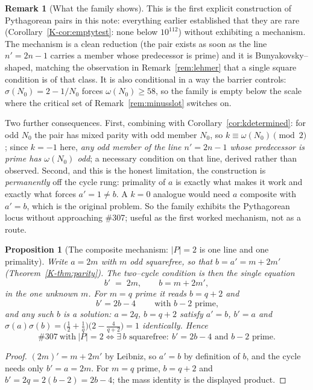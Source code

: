 \documentclass[11pt]{article}
\newtheorem{proposition}[theorem]{Proposition}
\theoremstyle{definition}
\newtheorem{remark}[theorem]{Remark}
\begin{document}
\begin{remark}[What the family shows]\label{rem:familyshows}
This is the first explicit construction of Pythagorean pairs in this note: everything earlier
established that they are rare \textup{(}Corollary~\ref{K-cor:emptytest}: none below $10^{112}$\textup{)}
without exhibiting a mechanism. The mechanism is a clean reduction (the pair exists as soon as the
line $n'=2n-1$ carries a member whose predecessor is prime) and it is Bunyakovsky--shaped, matching
the observation in Remark~\ref{rem:lehmer} that a single square condition is of that class. It is also
conditional in a way the barrier controls: $\sigma(N_0)=2-1/N_0$ forces $\omega(N_0)\ge58$, so the
family is empty below the scale where the critical set of Remark~\ref{rem:minusslot} switches on.

Two further consequences. First, combining with Corollary~\ref{cor:kdetermined}: for odd $N_0$ the
pair has mixed parity with odd member $N_0$, so $k\equiv\omega(N_0)\pmod2$; since $k=-1$ here,
\emph{any odd member of the line $n'=2n-1$ whose predecessor is prime has $\omega(N_0)$ odd}; a
necessary condition on that line, derived rather than observed. Second, and this is the honest
limitation, the construction is \emph{permanently} off the cycle rung: primality of $a$ is exactly
what makes it work and exactly what forces $a'=1\ne b$. A $k=0$ analogue would need $a$ composite with
$a'=b$, which is the original problem. So the family exhibits the Pythagorean locus without
approaching \#307; useful as the first worked mechanism, not as a route.
\end{remark}

\begin{proposition}[The composite mechanism: $|P|=2$ is one line and one primality]\label{prop:compositea}
Write $a=2m$ with $m$ odd squarefree, so that $b=a'=m+2m'$ \textup{(}Theorem~\ref{K-thm:parity}\textup{)}.
The two--cycle condition is then the single equation
\[ b'\;=\;2m,\qquad b=m+2m', \]
in the one unknown $m$. For $m=q$ prime it reads $b=q+2$ and
\[ \boxed{\ b'=2b-4\ }\qquad\text{with } b-2 \text{ prime}, \]
and any such $b$ \emph{is} a solution: $a=2q$, $b=q+2$ satisfy $a'=b$, $b'=a$ and
$\sigma(a)\sigma(b)=\bigl(\tfrac12+\tfrac1q\bigr)\bigl(2-\tfrac4{q+2}\bigr)=1$ identically. Hence
\[ \#307\ \text{with}\ |P|=2 \iff \exists\,b \text{ squarefree}:\ b'=2b-4 \text{ and } b-2 \text{ prime}. \]
\end{proposition}
\begin{proof}
$(2m)'=m+2m'$ by Leibniz, so $a'=b$ by definition of $b$, and the cycle needs only $b'=a=2m$. For
$m=q$ prime, $b=q+2$ and $b'=2q=2(b-2)=2b-4$; the mass identity is the displayed product.
\end{proof}
\end{document}

